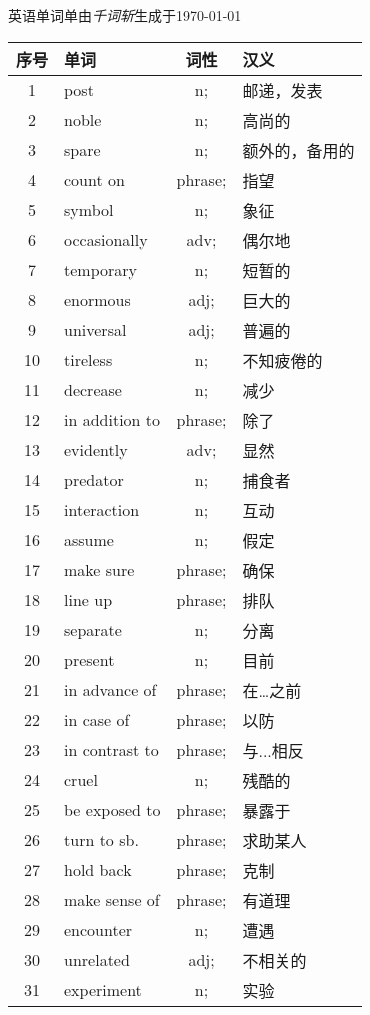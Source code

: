 \documentclass[UTF-8]{article}
\begin{document}
	\textsf{英语单词单}由\textit{千词斩}生成于\today
	\begin{longtable}{c|p{6cm}|c|p{6cm}}
		序号 & 单词 & 词性 & 汉义\\
\hline        1& post& n;& 邮递，发表 \\
\hline        2& noble& n;& 高尚的 \\
\hline        3& spare& n;& 额外的，备用的 \\
\hline        4& count on& phrase;& 指望 \\
\hline        5& symbol& n;& 象征 \\
\hline        6& occasionally& adv;& 偶尔地 \\
\hline        7& temporary& n;& 短暂的 \\
\hline        8& enormous& adj;& 巨大的 \\
\hline        9& universal& adj;& 普遍的 \\
\hline        10& tireless& n;& 不知疲倦的 \\
\hline        11& decrease& n;& 减少 \\
\hline        12& in addition to& phrase;& 除了 \\
\hline        13& evidently& adv;& 显然 \\
\hline        14& predator& n;& 捕食者 \\
\hline        15& interaction& n;& 互动 \\
\hline        16& assume& n;& 假定 \\
\hline        17& make sure& phrase;& 确保 \\
\hline        18& line up& phrase;& 排队 \\
\hline        19& separate& n;& 分离  \\
\hline        20& present& n;& 目前 \\
\hline        21& in advance of& phrase;& 在…之前 \\
\hline        22& in case of& phrase;& 以防 \\
\hline        23& in contrast to& phrase;& 与...相反 \\
\hline        24& cruel& n;& 残酷的 \\
\hline        25& be exposed to& phrase;& 暴露于 \\
\hline        26& turn to sb.& phrase;& 求助某人 \\
\hline        27& hold back& phrase;& 克制 \\
\hline        28& make sense of& phrase;& 有道理 \\
\hline        29& encounter& n;& 遭遇 \\
\hline        30& unrelated& adj;& 不相关的 \\
\hline        31& experiment& n;& 实验 \\
\end{longtable}
\end{document}
